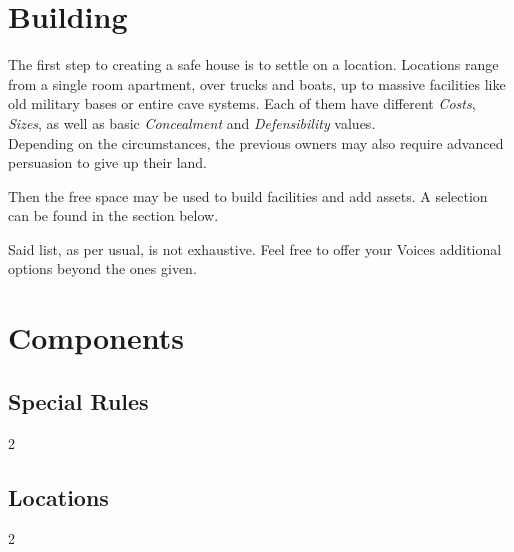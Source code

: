 \documentclass[12pt,a4paper,openany,usenames,dvipsnames]{book}
\begin{document}
	\chapter{Building}
	The first step to creating a safe house is to settle on a location.
	Locations range from a single room apartment,
		over trucks and boats,
		up to massive facilities like old military bases or entire cave systems.
	Each of them have different \emph{Costs}, \emph{Sizes},
		as well as basic \emph{Concealment} and \emph{Defensibility} values.\\
	Depending on the circumstances, the previous owners may also require advanced persuasion to give up their land.
	\par
	Then the free space may be used to build facilities and add assets.
	A selection can be found in the section below.\\
	\begin{exampleblock}
			Said list, as per usual, is not exhaustive.
			Feel free to offer your Voices additional options beyond the ones given.
	\end{exampleblock}

	\chapter{Components}
	\section{Special Rules} \vspace{8mm}
	\begin{multicols}{2}
	\end{multicols}

	\section{Locations} \vspace{5mm}
	\begin{multicols}{2}
	\end{multicols}
\end{document}
